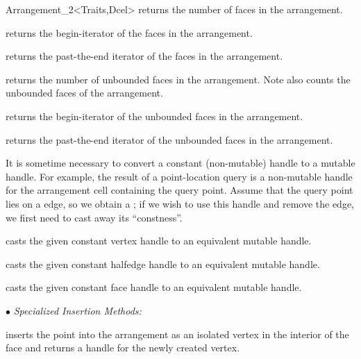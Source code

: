 \begin{ccRefClass}{Arrangement_2<Traits,Dcel>}
    {returns the number of faces in the arrangement.}

    {returns the begin-iterator of the faces in the arrangement.}
    
    {returns the past-the-end iterator of the faces in the arrangement.}

    {returns the number of unbounded faces in the arrangement.
     Note \ccVar{} also counts the unbounded faces
     of the arrangement.}

    {returns the begin-iterator of the unbounded faces in the arrangement.}
    
    {returns the past-the-end iterator of the unbounded faces in the
     arrangement.}

\begin{ccAdvanced}


It is sometime necessary to convert a constant (non-mutable) handle to
a mutable handle. For example, the result of a point-location query is
a non-mutable handle for the arrangement cell containing the query point.
Assume that the query point lies on a edge, so we obtain a
; if we wish to use this handle and remove the
edge, we first need to cast away its ``constness''.
 
    {casts the given constant vertex handle to an equivalent mutable handle.}

    {casts the given constant halfedge handle to an equivalent mutable handle.}

    {casts the given constant face handle to an equivalent mutable handle.}

\end{ccAdvanced}

\ccModifiers

$\bullet$ {\sl Specialized Insertion Methods:}

   {inserts the point  into the arrangement as an isolated vertex in
    the interior of the face  and returns a handle for the newly
    created vertex.
    }


\end{ccRefClass}
